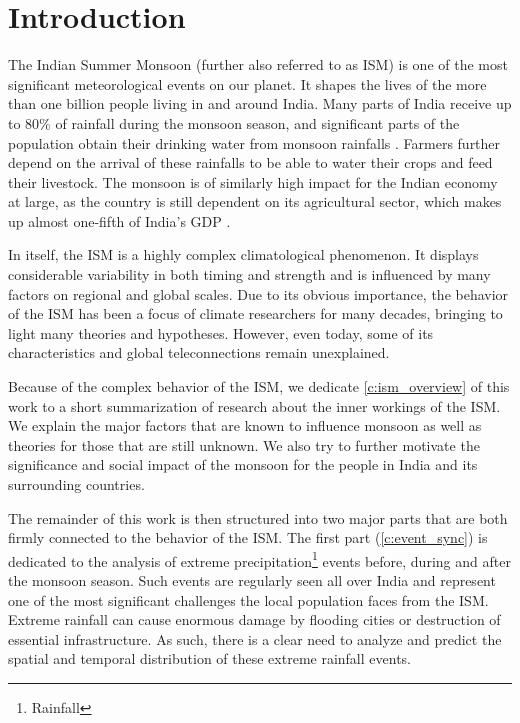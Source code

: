 \chapter{Introduction}
\label{c:introduction}

The Indian Summer Monsoon (further also referred to as ISM) is one of the most significant meteorological events on our planet. It shapes the lives of the more than one billion people living in and around India. Many parts of India receive up to 80\% of rainfall during the monsoon season, and significant parts of the population obtain their drinking water from monsoon rainfalls \citep{Stolbova.2015}. Farmers further depend on the arrival of these rainfalls to be able to water their crops and feed their livestock. The monsoon is of similarly high impact for the Indian economy at large, as the country is still dependent on its agricultural sector, which makes up almost one-fifth of India's GDP \citep{.05.01.2018}.

In itself, the ISM is a highly complex climatological phenomenon. It displays considerable variability in both timing and strength and is influenced by many factors on regional and global scales. Due to its obvious importance, the behavior of the ISM has been a focus of climate researchers for many decades, bringing to light many theories and hypotheses. However, even today, some of its characteristics and global teleconnections remain unexplained.

Because of the complex behavior of the ISM, we dedicate \cref{c:ism_overview} of this work to a short summarization of research about the inner workings of the ISM. We explain the major factors that are known to influence monsoon as well as theories for those that are still unknown. We also try to further motivate the significance and social impact of the monsoon for the people in India and its surrounding countries.

The remainder of this work is then structured into two major parts that are both firmly connected to the behavior of the ISM. The first part (\cref{c:event_sync}) is dedicated to the analysis of extreme precipitation\footnote{Rainfall} events before, during and after the monsoon season. Such events are regularly seen all over India and represent one of the most significant challenges the local population faces from the ISM. Extreme rainfall can cause enormous damage by flooding cities or destruction of essential infrastructure. As such, there is a clear need to analyze and predict the spatial and temporal distribution of these extreme rainfall events.

